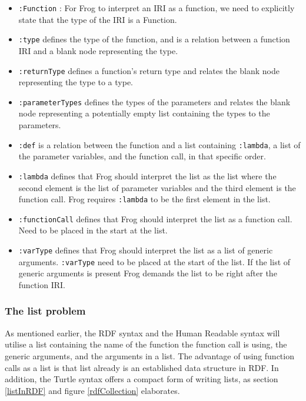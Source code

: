 \begin{itemize}
    \item \lstinline{:Function} : For Frog to interpret an IRI as a function, we need to explicitly state that the type of the IRI is a Function. 
    \item \lstinline{:type} defines the type of the function, and is a relation between a function IRI and a blank node representing the type.
    \item \lstinline{:returnType} defines a function's return type and relates the blank node representing the type to a type. 
    \item \lstinline{:parameterTypes} defines the types of the parameters and relates the blank node representing a potentially empty list containing the types to the parameters.
    \item \lstinline{:def} is a relation between the function and a list containing \lstinline{:lambda}, a list of the parameter variables, and the function call, in that specific order. 
    \item \lstinline{:lambda} defines that Frog should interpret the list as the list where the second element is the list of parameter variables and the third element is the function call. Frog requires \lstinline{:lambda} to be the first element in the list. 
    \item \lstinline{:functionCall} defines that Frog should interpret the list as a function call. Need to be placed in the start at the list. 
    \item \lstinline{:varType} defines that Frog should interpret the list as a list of generic arguments. \lstinline{:varType} need to be placed at the start of the list. If the list of generic arguments is present Frog demands the list to be right after the function IRI. 
  
\end{itemize}


\subsubsection{The list problem}
\label{theListProblem}
As mentioned earlier, the RDF syntax and the Human Readable syntax will utilise a list containing the name of the function the function call is using, the generic arguments, and the arguments in a list. The advantage of using function calls as a list is that list already is an established data structure in RDF. In addition, the Turtle syntax offers a compact form of writing lists, as section \ref{listInRDF} and figure \ref{rdfCollection} elaborates. 

